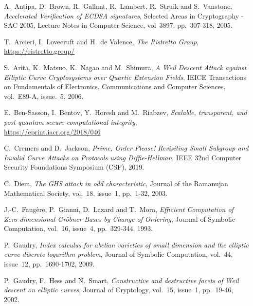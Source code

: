 \documentclass{llncs}
\begin{document}
\begin{thebibliography}{20}


A.~Antipa, D.~Brown, R.~Gallant, R.~Lambert, R.~Struik and S.~Vanstone,
\emph{Accelerated Verification of ECDSA signatures},
Selected Areas in Cryptography - SAC 2005, Lecture Notes in Computer
Science, vol~3897, pp.~307-318, 2005.

T.~Arcieri, I.~Lovecruft and H.~de Valence,
\emph{The Ristretto Group},\\
\url{https://ristretto.group/}

S.~Arita, K.~Matsuo, K.~Nagao and M.~Shimura,
\emph{A Weil Descent Attack against Elliptic Curve Cryptosystems over
Quartic Extension Fields},
IEICE Transactions on Fundamentals of Electronics, Communications and
Computer Sciences, vol.~E89-A, issue.~5, 2006.

E.~Ben-Sasson, I.~Bentov, Y.~Horesh and M.~Riabzev,
\emph{Scalable, transparent, and post-quantum secure computational integrity},\\
\url{https://eprint.iacr.org/2018/046}

C.~Cremers and D.~Jackson,
\emph{Prime, Order Please! Revisiting Small Subgroup and Invalid Curve
Attacks on Protocols using Diffie-Hellman},
IEEE 32nd Computer Security Foundations Symposium (CSF), 2019.

C.~Diem,
\emph{The GHS attack in odd characteristic},
Journal of the Ramanujan Mathematical Society, vol.~18, issue~1,
pp.~1-32, 2003.

J.-C.~Faugère, P.~Gianni, D.~Lazard and T.~Mora,
\emph{Efficient Computation of Zero-dimensional Gröbner Bases by Change
of Ordering},
Journal of Symbolic Computation, vol.~16, issue~4, pp.~329-344, 1993.

P.~Gaudry,
\emph{Index calculus for abelian varieties of small dimension and the
elliptic curve discrete logarithm problem},
Journal of Symbolic Computation, vol.~44, issue~12, pp.~1690-1702, 2009.

P.~Gaudry, F.~Hess and N.~Smart,
\emph{Constructive and destructive facets of Weil descent on elliptic curves},
Journal of Cryptology, vol.~15, issue~1, pp.~19-46, 2002.


\end{thebibliography}
\end{document}
